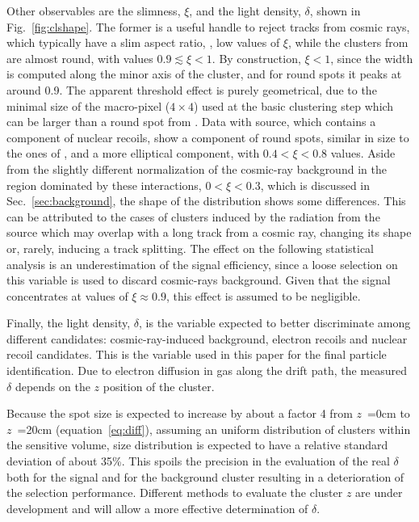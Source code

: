 Other observables are the slimness, $\xi$, and the light density,
$\delta$, shown in Fig.~\ref{fig:clshape}. The former is a useful
handle to reject tracks from cosmic rays, which typically have a slim
aspect ratio, \ie, low values of $\xi$, while the clusters from \fe
are almost round, with values $0.9\lesssim\xi<1$. By construction,
$\xi<1$, since the width is computed along the minor axis of the
cluster, and for round spots it peaks at around 0.9. The apparent
threshold effect is purely geometrical, due to the minimal size of the
macro-pixel ($4{\times}4$) used at the basic clustering step which can
be larger than a round spot from \fe. Data with \ambe source, which
contains a component of nuclear recoils, show a component of round
spots, similar in size to the ones of \fe, and a more elliptical
component, with $0.4<\xi<0.8$ values. Aside from the slightly
different normalization of the cosmic-ray background in the region
dominated by these interactions, $0<\xi<0.3$, which is discussed in
Sec.~\ref{sec:background}, the shape of the distribution shows some
differences. This can be attributed to the cases of clusters induced
by the radiation from the source which may overlap with a long track
from a cosmic ray, changing its shape or, rarely, inducing a track
splitting.  The effect on the following statistical analysis is an
underestimation of the signal efficiency, since a loose selection on
this variable is used to discard cosmic-rays background. Given that
the signal concentrates at values of $\xi \approx 0.9$, this effect is
assumed to be negligible.

Finally, the light density, $\delta$, is the variable expected to
better discriminate among different candidates: cosmic-ray-induced
background, electron recoils and nuclear recoil candidates. This is
the variable used in this paper for the final particle identification.
Due to electron diffusion in gas along the drift path, the measured
$\delta$ depends on the $z$ position of the cluster.

Because the spot size is expected to increase by about a factor 4 from 
$z$~=0\unit{cm} to $z$~=20\unit{cm} (equation~\ref{eq:diff}), 
assuming an uniform distribution of clusters within the sensitive volume, 
size distribution is expected to have a relative standard deviation of about 35\%.
This spoils the precision in the evaluation of the real $\delta$ 
both for the signal and for the background cluster resulting in a deterioration of the selection performance.
Different methods to evaluate the cluster $z$ are under development and will
allow a more effective determination of $\delta$.

